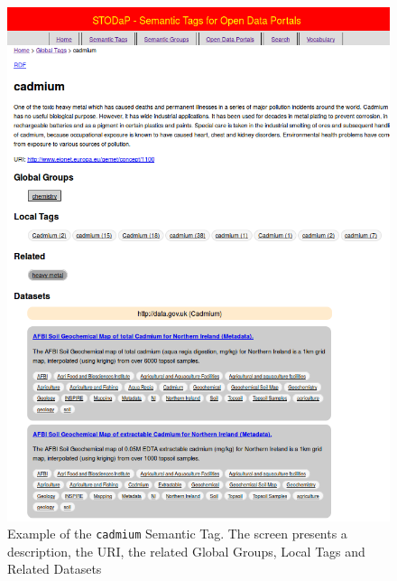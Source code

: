 \begin{figure}[h]
\begin{center}
\includegraphics[width=\columnwidth]{images/stodapscreen_semantictag.png}
\caption[Example of the \texttt{cadmium} Semantic Tag.]{Example of the \texttt{cadmium} Semantic Tag. The screen presents a description, the URI, the related Global Groups, Local Tags and Related Datasets}
\label{fig:stodap_semantictag}
\end{center}
\end{figure}

